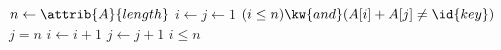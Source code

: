 \begin{codebox}
\li	$n \gets \attrib{A}{length}$
\li	$i \gets j \gets 1$
\li \While $(i \leq n) \kw{ and } (A[i] + A[j] \neq \id{key})$
\li 	\Do
			\If $j = n$
\li				\Then
					$i \gets i + 1$
\li				\Else
\li					$j \gets j + 1$
				\End
		\End
\li	\Return $i \leq n$				
\end{codebox}